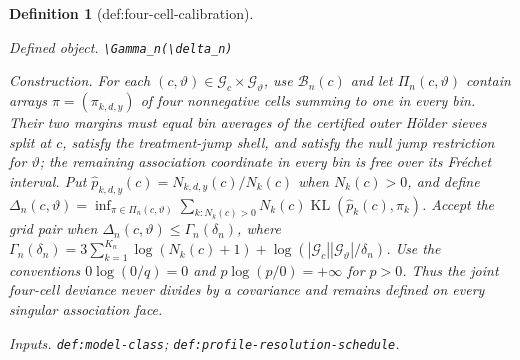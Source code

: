 \documentclass{article}
\newtheorem{definition}{Definition}
\begin{document}
\begin{definition}[def:four-cell-calibration]\label{def:four-cell-calibration}
\par\smallskip\noindent\emph{Defined object.} \texttt{\textbackslash{}\allowbreak{}Gamma\_\allowbreak{}n(\textbackslash{}\allowbreak{}delta\_\allowbreak{}n)}
\par\smallskip\noindent\emph{Construction.} For each \((c,\vartheta)\in\mathcal G_c\times\mathcal G_\vartheta\), use \(\mathcal B_n(c)\) and let \(\Pi_n(c,\vartheta)\) contain arrays \(\pi=(\pi_{k,d,y})\) of four nonnegative cells summing to one in every bin. Their two margins must equal bin averages of the certified outer H\"older sieves split at \(c\), satisfy the treatment-jump shell, and satisfy the null jump restriction for \(\vartheta\); the remaining association coordinate in every bin is free over its Fr\'echet interval. Put \(\widehat p_{k,d,y}(c)=N_{k,d,y}(c)/N_k(c)\) when \(N_k(c)>0\), and define \(\Delta_n(c,\vartheta)=\inf_{\pi\in\Pi_n(c,\vartheta)}\sum_{k:N_k(c)>0}N_k(c)\operatorname{KL}(\widehat p_k(c),\pi_k)\). Accept the grid pair when \(\Delta_n(c,\vartheta)\le\Gamma_n(\delta_n)\), where \(\Gamma_n(\delta_n)=3\sum_{k=1}^{K_n}\log(N_k(c)+1)+\log(|\mathcal G_c||\mathcal G_\vartheta|/\delta_n)\). Use the conventions \(0\log(0/q)=0\) and \(p\log(p/0)=+\infty\) for \(p>0\). Thus the joint four-cell deviance never divides by a covariance and remains defined on every singular association face.
\par\smallskip\noindent\emph{Inputs.} \texttt{def:\allowbreak{}model-\allowbreak{}class}; \texttt{def:\allowbreak{}profile-\allowbreak{}resolution-\allowbreak{}schedule}.
\end{definition}
\end{document}

